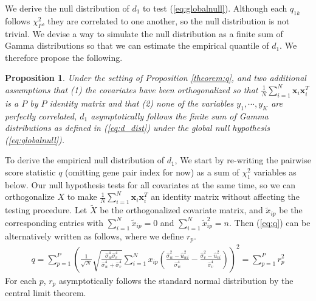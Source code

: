 \documentclass[aap,authoryear, preprint]{imsart}
\numberwithin{equation}{section}
\theoremstyle{plain}
\newtheorem{prop}{Proposition}
\begin{document}
We derive the null distribution of $d_1$ to test (\ref{eq:globalnull}). Although each ${q}_{1k}$ follows $\chi_{P}^2$, they are correlated to one another, so the null distribution is not trivial. We devise a way to simulate the null distribution as a finite sum of Gamma distributions so that we can estimate the empirical quantile of $d_1$. We therefore propose the following.

\begin{prop}
Under the setting of Proposition \ref{theorem:q}, and two additional assumptions that (1) the covariates have been orthogonalized so that 
$\frac{1}{N} \sum_{i=1}^{N} \bm{x}_i \bm{x}_i^T$ is a $P$ by $P$ identity matrix and that (2) none of the variables $y_1, \cdots, y_K$ are perfectly correlated, $d_1$ asymptotically follows the finite sum of Gamma distributions as defined in (\ref{eq:d_dist}) under the global null hypothesis (\ref{eq:globalnull}). 
\end{prop}

To derive the empirical null distribution of $d_1$, We start by re-writing the pairwise score statistic $q$ (omitting gene pair index for now) as a sum of $\chi_1^2$ variables as below. Our null hypothesis tests for all covariates at the same time, so we can orthogonalize $X$ to make $\frac{1}{N} \sum_{i=1}^{N} \bm{x}_i \bm{x}_i^T$ an identity matrix without affecting the testing procedure. Let $\tilde{X}$ be the orthogonalized covariate matrix, and $\tilde{x}_{ip}$ be the corresponding entries with $\sum_{i=1}^{N}\tilde{x}_{ip} = 0$ and $\sum_{i=1}^{N} \tilde{x}_{ip}^2  = n$. Then (\ref{eq:q}) can be alternatively written as follows, where we define $r_{p}.$
\begin{align}
q = \sum_{p=1}^{P}
 \left(\frac{1}{\sqrt{N}}
 \sqrt{\frac{\hat{\sigma}_w^4 \hat{\sigma}_v^4}{\hat{\sigma}_w^4 + \hat{\sigma}_v^4}}
 \sum_{i=1}^{N} x_{ip} \left( \frac{\hat{\sigma}_w^2 - \hat{u}_{wi}^2}{\hat{\sigma}_w^4}
 - \frac{\hat{\sigma}_v^2 - \hat{u}_{vi}^2}{\hat{\sigma}_v^4}
 \right)
\right)^2 = \sum_{p=1}^{P}r_p^2
\label{eq:r}
\end{align}
For each $p$, $r_p$ asymptotically follows the standard normal distribution by the central limit theorem. \\
\end{document}
